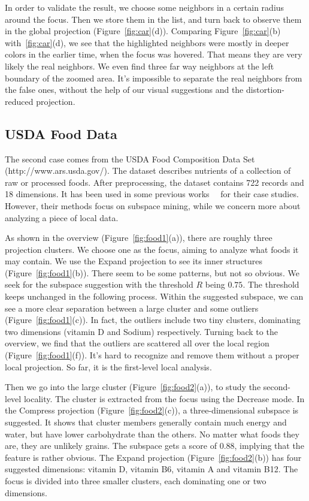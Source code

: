 In order to validate the result, we choose some neighbors in a certain radius around the focus. Then we store them in the list, and turn back to observe them in the global projection (Figure~\ref{fig:car}(d)). Comparing Figure~\ref{fig:car}(b) with~\ref{fig:car}(d), we see that the highlighted neighbors were mostly in deeper colors in the earlier time, when the focus was hovered. That means they are very likely the real neighbors. We even find three far way neighbors at the left boundary of the zoomed area. It's impossible to separate the real neighbors from the false ones, without the help of our visual suggestions and the distortion-reduced projection.

\subsection{USDA Food Data}
\label{case:food}
The second case comes from the USDA Food Composition Data Set (http://www.ars.usda.gov/).  The dataset describes nutrients of a collection of raw or processed foods. After preprocessing, the dataset contains 722 records and 18 dimensions. It has been used in some previous works~\cite{DBLP:conf/ieeevast/TatuMFBSSK12}~\cite{DBLP:journals/tvcg/YuanRWG13} for their case studies. However, their methods focus on subspace mining, while we concern more about analyzing a piece of local data.

As shown in the overview (Figure~\ref{fig:food1}(a)), there are roughly three projection clusters. We choose one as the focus, aiming to analyze what foods it may contain. We use the Expand projection to see its inner structures (Figure~\ref{fig:food1}(b)). There seem to be some patterns, but not so obvious. We seek for the subspace suggestion with the threshold $R$ being $0.75$. The threshold keeps unchanged in the following process. Within the suggested subspace, we can see a more clear separation between a large  cluster and some outliers (Figure~\ref{fig:food1}(c)). In fact, the outliers include two tiny clusters, dominating two dimensions (vitamin D and Sodium) respectively. Turning back to the overview, we find that the outliers are scattered all over the local region (Figure~\ref{fig:food1}(f)). It's hard to recognize and remove them without a proper local projection. So far, it is the first-level local analysis.

Then we go into the large cluster (Figure~\ref{fig:food2}(a)), to study the second-level locality. The cluster is extracted from the focus using the Decrease mode. In the Compress projection (Figure~\ref{fig:food2}(c)), a three-dimensional subspace is suggested. It shows that cluster members generally contain much energy and water, but have lower carbohydrate than the others. No matter what foods they are, they are unlikely grains. The subspace gets a score of 0.88, implying that the feature is rather obvious. The Expand projection (Figure~\ref{fig:food2}(b)) has four suggested dimensions: vitamin D, vitamin B6, vitamin A and vitamin B12. The focus is divided into three smaller clusters, each dominating one or two dimensions.


